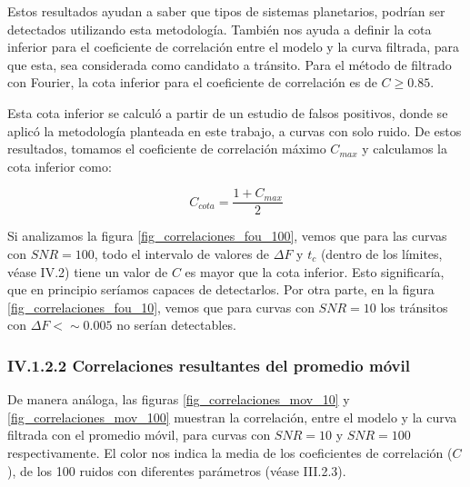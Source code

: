 Estos resultados ayudan a saber que tipos de sistemas planetarios, podrían ser detectados utilizando esta metodología. También nos ayuda a definir la cota inferior para el coeficiente de correlación entre el modelo y la curva filtrada, para que esta, sea considerada como candidato a tránsito. Para el método de filtrado con Fourier, la cota inferior para el coeficiente de correlación es de $C \geq 0.85 $. 

Esta cota inferior se calculó a partir de un estudio de falsos positivos, donde se aplicó la metodología planteada en este trabajo, a curvas con solo ruido. De estos resultados, tomamos el coeficiente de correlación máximo $C_{max}$ y calculamos la cota inferior como: 

\begin{equation}
	C_{cota}= \dfrac{1+C_{max}}{2}
\end{equation}


Si analizamos la figura \ref{fig_correlaciones_fou_100}, vemos que para las curvas con $SNR=100$, todo el intervalo de valores de $\Delta F$ y $t_{c}$ (dentro de los límites, véase IV.2) tiene un valor de $C$ es mayor que la cota inferior. Esto significaría, que en principio seríamos capaces de detectarlos. Por otra parte, en la figura \ref{fig_correlaciones_fou_10}, vemos que para curvas con $SNR=10$ los tránsitos con $\Delta F < \sim 0.005$ no serían detectables.

\subsubsection*{IV.1.2.2 Correlaciones resultantes del promedio móvil}

De manera análoga, las figuras \ref{fig_correlaciones_mov_10} y \ref{fig_correlaciones_mov_100} muestran la correlación, entre el modelo y la curva filtrada con el promedio móvil, para curvas con $SNR=10$ y $SNR=100$ respectivamente. El color nos indica la media de los coeficientes de correlación ($C$), de los 100 ruidos con diferentes parámetros (véase III.2.3).

